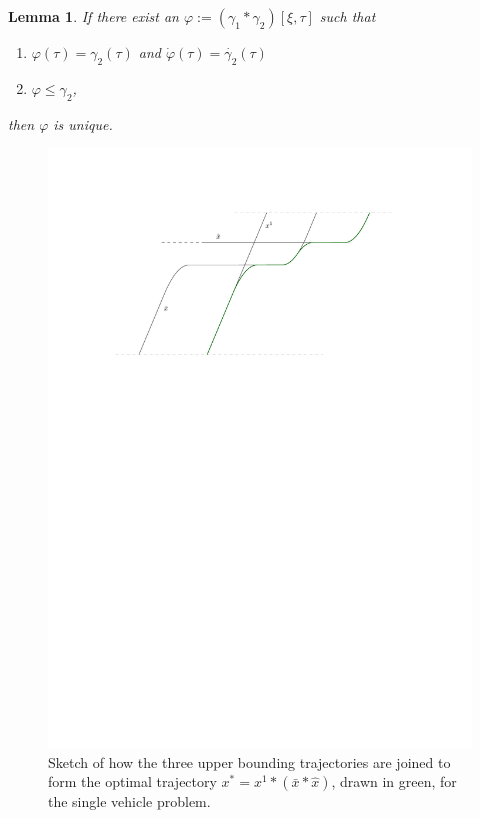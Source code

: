 \documentclass[a4paper]{article}
\theoremstyle{definition}
\theoremstyle{plain}
\newtheorem{lemma}{Lemma\hspace{0.25em}\ignorespaces}
\begin{document}
\begin{lemma}\label{lemma:unique}
  If there exist an $\varphi := (\gamma_{1} * \gamma_{2})[\xi, \tau]$
  such that
  \begin{enumerate}[label=(\roman*)\quad,leftmargin=5em]
    \item $\varphi(\tau) = \gamma_{2}(\tau)$ and
          $\dot{\varphi}(\tau) = \dot{\gamma_{2}}(\tau)$
    \item $\varphi \leq \gamma_{2}$,
  \end{enumerate}
  then $\varphi$ is unique.
\end{lemma}


\begin{figure}
  \centering
  \includegraphics[scale=1]{figures/motion/rough/proof}
  \caption{Sketch of how the three upper bounding trajectories are joined to
    form the optimal trajectory $x^{*} = x^{1} * (\bar{x} * \hat{x})$, drawn in
    green, for the single vehicle problem.}%
  \label{fig:theorem-proof}
\end{figure}
\end{document}
